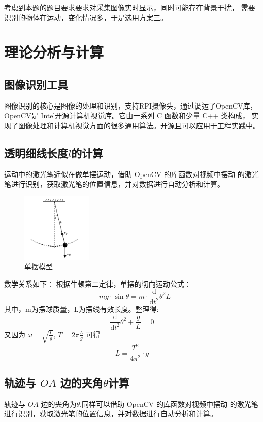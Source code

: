 \documentclass[scheme=chinese,a4paper]{article}
\begin{document}
考虑到本题的题目要求要求对采集图像实时显示，同时可能存在背景干扰，
需要识别的物体在运动，变化情况多，于是选用方案三。

\section{理论分析与计算}

\subsection{图像识别工具}
图像识别的核心是图像的处理和识别，支持RPI摄像头，通过调运了OpenCV库，OpenCV是
Intel开源计算机视觉库。它由一系列 C 函数和少量 C++ 类构成，
实现了图像处理和计算机视觉方面的很多通用算法。开源且可以应用于工程实践中。
\subsection{透明细线长度$l$的计算}
运动中的激光笔近似在做单摆运动，借助 OpenCV 的库函数对视频中摆动
的激光笔进行识别，获取激光笔的位置信息，并对数据进行自动分析和计算。
\begin{figure}[H]
  \centering
  \includegraphics[width=0.3\textwidth]{7.png}
  \caption{单摆模型}
\end{figure}
数学关系如下：
根据牛顿第二定律，单摆的切向运动公式：
\begin{equation}
  -mg\cdot\sin\theta =m \cdot \frac{\mathrm{d}}{\mathrm{d}t^2}{\theta^2} L
\end{equation}
其中，m为摆球质量，L为摆线有效长度。整理得:
\begin{equation}
  \frac{\mathrm{d}}{\mathrm{d}t^2}{\theta^2} +\frac{g}{L}=0
\end{equation}
又因为
$\omega=\sqrt{\frac{L}{g}}$,
$T=2\pi\frac{L}{g}$
可得
\begin{equation}
  L=\frac{T^{2}}{4\pi^{2}}\cdot g
\end{equation}
\subsection{轨迹与 $OA$ 边的夹角$\theta$计算}
轨迹与 $OA$ 边的夹角为$\theta$,同样可以借助 OpenCV 的库函数对视频中摆动
的激光笔进行识别，获取激光笔的位置信息，并对数据进行自动分析和计算。
\end{document}
